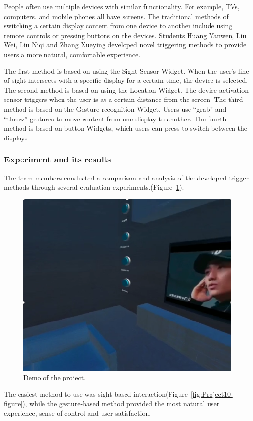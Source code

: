 People often use multiple devices with similar functionality. For example, TVs, computers, and mobile phones all have screens. The traditional methods of switching a certain display content from one device to another include using remote controls or pressing buttons on the devices. Students Huang Yanwen, Liu Wei, Liu Niqi and Zhang Xueying developed novel triggering methods to provide users a more natural, comfortable experience.

The first method is based on using the Sight Sensor Widget. When the user's line of sight intersects with a specific display for a certain time, the device is selected. The second method is based on using the Location Widget. The device activation sensor triggers when the user is at a certain distance from the screen. The third method is based on the Gesture recognition Widget. Users use ``grab'' and ``throw'' gestures to move content from one display to another. The fourth method is based on button Widgets, which users can press to switch between the displays.

\subsubsection{Experiment and its results}

The team members conducted a comparison and analysis of the developed trigger methods through several evaluation experiments.(Figure~\ref{fig:Project2-figure}).

\begin{figure}
  \centering
  \includegraphics[width=0.6\linewidth]{figures/Project_2.png}
  \caption{Demo of the project.}
  \label{fig:Project2-figure}
\end{figure}

The easiest method to use was sight-based interaction(Figure~\ref{fig:Project10-figure}), while the gesture-based method provided the most natural user experience, sense of control and user satisfaction.

